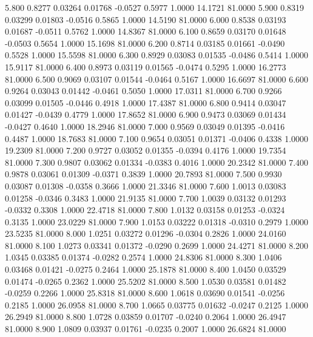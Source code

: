    5.800   0.8277   0.03264   0.01768  -0.0527   0.5977   1.0000  14.1721  81.0000
   5.900   0.8319   0.03299   0.01803  -0.0516   0.5865   1.0000  14.5190  81.0000
   6.000   0.8538   0.03193   0.01687  -0.0511   0.5762   1.0000  14.8367  81.0000
   6.100   0.8659   0.03170   0.01648  -0.0503   0.5654   1.0000  15.1698  81.0000
   6.200   0.8714   0.03185   0.01661  -0.0490   0.5528   1.0000  15.5598  81.0000
   6.300   0.8929   0.03083   0.01535  -0.0486   0.5414   1.0000  15.9117  81.0000
   6.400   0.8973   0.03119   0.01565  -0.0474   0.5295   1.0000  16.2773  81.0000
   6.500   0.9069   0.03107   0.01544  -0.0464   0.5167   1.0000  16.6697  81.0000
   6.600   0.9264   0.03043   0.01442  -0.0461   0.5050   1.0000  17.0311  81.0000
   6.700   0.9266   0.03099   0.01505  -0.0446   0.4918   1.0000  17.4387  81.0000
   6.800   0.9414   0.03047   0.01427  -0.0439   0.4779   1.0000  17.8652  81.0000
   6.900   0.9473   0.03069   0.01434  -0.0427   0.4640   1.0000  18.2946  81.0000
   7.000   0.9569   0.03049   0.01395  -0.0416   0.4487   1.0000  18.7683  81.0000
   7.100   0.9654   0.03051   0.01371  -0.0406   0.4338   1.0000  19.2309  81.0000
   7.200   0.9727   0.03052   0.01355  -0.0394   0.4176   1.0000  19.7354  81.0000
   7.300   0.9807   0.03062   0.01334  -0.0383   0.4016   1.0000  20.2342  81.0000
   7.400   0.9878   0.03061   0.01309  -0.0371   0.3839   1.0000  20.7893  81.0000
   7.500   0.9930   0.03087   0.01308  -0.0358   0.3666   1.0000  21.3346  81.0000
   7.600   1.0013   0.03083   0.01258  -0.0346   0.3483   1.0000  21.9135  81.0000
   7.700   1.0039   0.03132   0.01293  -0.0332   0.3308   1.0000  22.4718  81.0000
   7.800   1.0132   0.03158   0.01253  -0.0324   0.3135   1.0000  23.0229  81.0000
   7.900   1.0153   0.03222   0.01318  -0.0310   0.2979   1.0000  23.5235  81.0000
   8.000   1.0251   0.03272   0.01296  -0.0304   0.2826   1.0000  24.0160  81.0000
   8.100   1.0273   0.03341   0.01372  -0.0290   0.2699   1.0000  24.4271  81.0000
   8.200   1.0345   0.03385   0.01374  -0.0282   0.2574   1.0000  24.8306  81.0000
   8.300   1.0406   0.03468   0.01421  -0.0275   0.2464   1.0000  25.1878  81.0000
   8.400   1.0450   0.03529   0.01474  -0.0265   0.2362   1.0000  25.5202  81.0000
   8.500   1.0530   0.03581   0.01482  -0.0259   0.2266   1.0000  25.8318  81.0000
   8.600   1.0618   0.03690   0.01541  -0.0256   0.2185   1.0000  26.0958  81.0000
   8.700   1.0665   0.03775   0.01632  -0.0247   0.2125   1.0000  26.2949  81.0000
   8.800   1.0728   0.03859   0.01707  -0.0240   0.2064   1.0000  26.4947  81.0000
   8.900   1.0809   0.03937   0.01761  -0.0235   0.2007   1.0000  26.6824  81.0000

